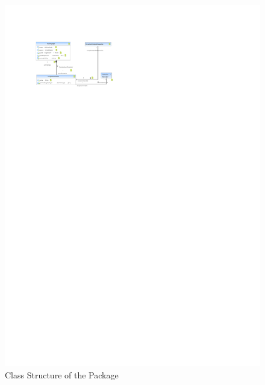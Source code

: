 %
%

\begin{figure}[htb]
  \centering
  \includegraphics[scale=2]{figures/A_technical-reference/packages/storydiagrams_activities_expressions/storydiagrams-activities-expressions}
  \caption{Class Structure of the  Package}
  \label{fig:MM:activities:expressions}
\end{figure}